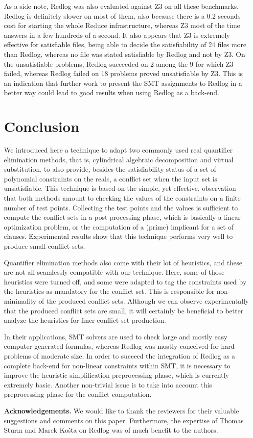 \documentclass{llncs}
\begin{document}
As a side note, Redlog was also evaluated against Z3 on all these benchmarks.
Redlog is definitely slower on most of them, also because there is a 0.2 seconds
cost for starting the whole Reduce infrastructure, whereas Z3 most of the
time answers in a few hundreds of a second.  It also appears that Z3 is
extremely effective for satisfiable files, being able to decide the
satisfiability of 24 files more than Redlog, whereas no file was stated
satisfiable by Redlog and not by Z3.  On the unsatisfiable problems, Redlog
succeeded on 2 among the 9 for which Z3 failed, whereas Redlog failed on 18
problems proved unsatisfiable by Z3.  This is an indication that further work to
present the SMT assignments to Redlog in a better way could lead to good results
when using Redlog as a back-end.

\section{Conclusion}

We introduced here a technique to adapt two commonly used real quantifier
elimination methods, that is, cylindrical algebraic decomposition and virtual
substitution, to also provide, besides the satisfiability status of a set of
polynomial constraints on the reals, a conflict set when the input set is
unsatisfiable.  This technique is based on the simple, yet effective,
observation that both methods amount to checking the values of the constraints
on a finite number of test points.  Collecting the test points and the values is
sufficient to compute the conflict sets in a post-processing phase, which is
basically a linear optimization problem, or the computation of a (prime)
implicant for a set of clauses.  Experimental results show that this technique
performs very well to produce small conflict sets.

Quantifier elimination methods also come with their lot of heuristics, and these
are not all seamlessly compatible with our technique.  Here, some of those
heuristics were turned off, and some were adapted to tag the constraints used by
the heuristics as mandatory for the conflict set.  This is responsible for
non-minimality of the produced conflict sets.  Although we can observe
experimentally that the produced conflict sets are small, it will certainly be
beneficial to better analyze the heuristics for finer conflict set production.

In their applications, SMT solvers are used to check large and mostly easy
computer generated formulas, whereas Redlog was mostly conceived for hard
problems of moderate size.  In order to succeed the integration of Redlog as a
complete back-end for non-linear constraints within SMT, it is necessary to
improve the heuristic simplification preprocessing phase, which is currently
extremely basic.  Another non-trivial issue is to take into account this
preprocessing phase for the conflict computation.\newline

\noindent\textbf{Acknowledgements.} We would like to thank the reviewers for
their valuable suggestions and comments on this paper. Furthermore, the
expertise of Thomas Sturm and Marek Ko\v{s}ta on Redlog was of much benefit to
the authors.



\end{document}
